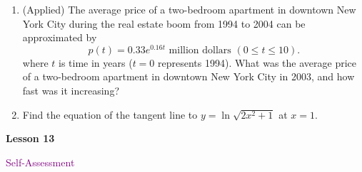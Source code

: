 \documentclass[10pt]{book}
\theoremstyle{definition}
\theoremstyle{remark}
\begin{document}
\begin{large}
\begin{enumerate}
\item (Applied) The average price of a two-bedroom apartment in downtown New York City during the real estate boom from 1994 to 2004 can be approximated by 
\[p(t) = 0.33e^{0.16t} \text{  million dollars }  (0 \leq t \leq 10).\] where $t$ is time in years ($t = 0$ represents 1994). What was the average price of a two-bedroom apartment in downtown New York City in 2003, and how fast was it increasing?\vfil\vfil

\item Find the equation of the tangent line to $y = \ln \sqrt{2x^2 + 1}$ at $x=1$.\vfil
\end{enumerate}
\end{large}
\newpage


\begin{tcolorbox}[
  width=\textwidth,
  colback=gray!10, %
  colframe=white, %
  boxrule=0pt,    %
  left=1cm,       %
  right=1cm,      %
  sharp corners  %
]

\begin{minipage}[t]{0.5\textwidth}
  \Huge \textbf{Lesson 13}
\end{minipage}%
\hfill
\begin{minipage}[t]{0.5\textwidth}
  \Huge\textcolor{purple}{Self-Assessment}
\end{minipage}
\end{tcolorbox}
\end{document}
